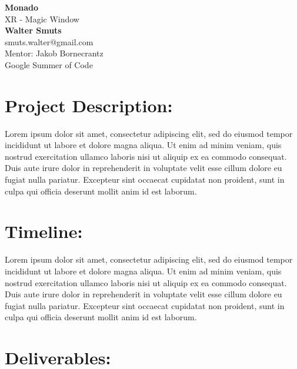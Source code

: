 \documentclass{article}
\begin{document}
\begin{center}

\LARGE{\textbf{Monado}} \\
\vspace{1em}
\Large{XR - Magic Window} \\
\vspace{1em}
\normalsize\textbf{Walter Smuts} \\
\normalsize{smuts.walter@gmail.com} \\
\vspace{1em}
\normalsize{Mentor: Jakob Bornecrantz} \\
\vspace{1em}
\normalsize{Google Summer of Code} \\

\end{center}
\begin{normalsize}

\section{Project Description:}

Lorem ipsum dolor sit amet, consectetur adipiscing elit, sed do eiusmod tempor
incididunt ut labore et dolore magna aliqua. Ut enim ad minim veniam, quis nostrud
exercitation ullamco laboris nisi ut aliquip ex ea commodo consequat. Duis aute
irure dolor in reprehenderit in voluptate velit esse cillum dolore eu fugiat nulla
pariatur. Excepteur sint occaecat cupidatat non proident, sunt in culpa qui
officia deserunt mollit anim id est laborum.

\section{Timeline:}

Lorem ipsum dolor sit amet, consectetur adipiscing elit, sed do eiusmod tempor
incididunt ut labore et dolore magna aliqua. Ut enim ad minim veniam, quis nostrud
exercitation ullamco laboris nisi ut aliquip ex ea commodo consequat. Duis aute
irure dolor in reprehenderit in voluptate velit esse cillum dolore eu fugiat nulla
pariatur. Excepteur sint occaecat cupidatat non proident, sunt in culpa qui
officia deserunt mollit anim id est laborum.

\section{Deliverables:}


\end{normalsize}
\end{document}
